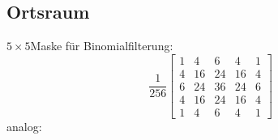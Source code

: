 \documentclass[12pt]{article}
\begin{document}
\subsection{Ortsraum}
$5 \times 5$Maske für Binomialfilterung:
\begin{equation*}
\frac{1}{256} \begin{bmatrix}
1 & 4 & 6 & 4 & 1 \\
4 & 16 & 24 & 16 & 4 \\
6 & 24 & 36 & 24 & 6 \\
4 & 16 & 24 & 16 & 4 \\
1 & 4 & 6 & 4 & 1 
\end{bmatrix}
\end{equation*}
analog: 
\begin{figure}[ht]\centering
\end{figure}
\end{document}
